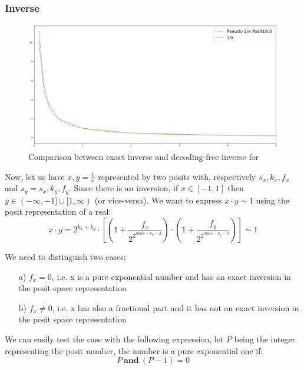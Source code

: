 \subsubsection{Inverse}

\begin{figure}
    \centering
    \includegraphics[width=\linewidth]{img/invPosit160.png}
    \caption{Comparison between exact inverse and decoding-free inverse for }
    \label{fig:invPosit160}
\end{figure}

Now, let us have $x, y = \frac{1}{x}$ represented  by two posits with, respectively $s_x,k_x, f_x$ and $s_y = s_x, k_y, f_y$. Since there is an inversion, if $x \in [-1,1]$ then $y \in (-\infty, -1] \cup [1,\infty)$ (or vice-versa). We want to express $x \cdot y \sim 1$ using the posit representation of a real:
\begin{equation}\label{eqn:positx0prodInverse}
    x \cdot y = 2^{k_x+k_y} \cdot \left[ \left (1 + \frac{f_x}{2^{2^{nbits + k_x - 2}}} \right ) \cdot \left (1 + \frac{f_y}{2^{2^{nbits - k_y - 3}}} \right ) \right] \sim 1
\end{equation}

We need to distinguish two cases:
\begin{itemize}
    \item[a)]$f_x = 0$, i.e. x is a pure exponential number and has an exact inversion in the posit space representation
    \item[b)] $f_x \neq 0$, i.e. x has also a fractional part and it has not an exact inversion in the posit space representation
\end{itemize}

We can easily test the case with the following expression, let $P$ being the integer representing the posit number, the number is a pure exponential one if: 
\begin{equation}
    P\ \mathbf{and}\ (P - 1) = 0
\end{equation}

